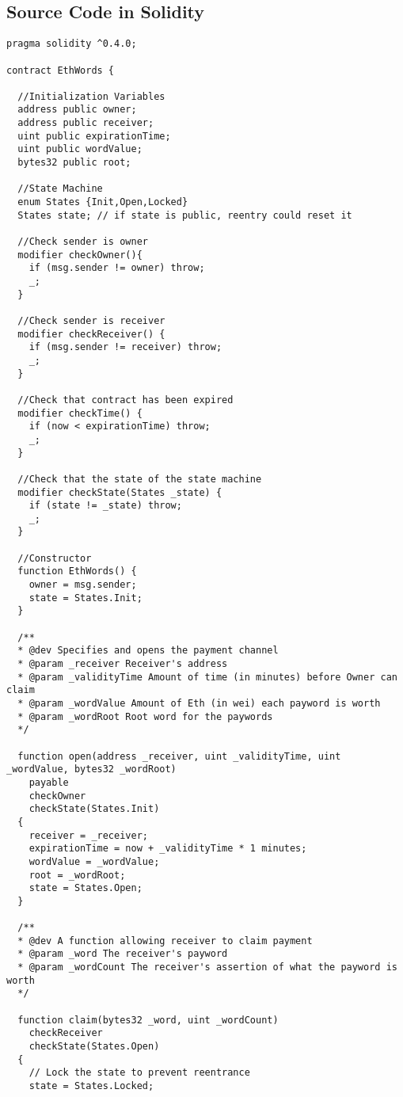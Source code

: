 
\subsection{\ew Source Code in Solidity}
\label{sec:code}

\begin{lstlisting}[basicstyle=\scriptsize\ttfamily]
pragma solidity ^0.4.0;

contract EthWords {

  //Initialization Variables
  address public owner;
  address public receiver;
  uint public expirationTime;
  uint public wordValue;
  bytes32 public root;

  //State Machine
  enum States {Init,Open,Locked}
  States state; // if state is public, reentry could reset it

  //Check sender is owner
  modifier checkOwner(){
    if (msg.sender != owner) throw;
    _;
  }

  //Check sender is receiver
  modifier checkReceiver() {
    if (msg.sender != receiver) throw;
    _;
  }

  //Check that contract has been expired
  modifier checkTime() {
    if (now < expirationTime) throw;
    _;
  }

  //Check that the state of the state machine
  modifier checkState(States _state) {
    if (state != _state) throw;
    _;
  }

  //Constructor
  function EthWords() {
    owner = msg.sender;
    state = States.Init;
  }

  /**
  * @dev Specifies and opens the payment channel
  * @param _receiver Receiver's address
  * @param _validityTime Amount of time (in minutes) before Owner can claim
  * @param _wordValue Amount of Eth (in wei) each payword is worth
  * @param _wordRoot Root word for the paywords
  */

  function open(address _receiver, uint _validityTime, uint _wordValue, bytes32 _wordRoot)
    payable
    checkOwner
    checkState(States.Init)
  {
    receiver = _receiver;
    expirationTime = now + _validityTime * 1 minutes;
    wordValue = _wordValue;
    root = _wordRoot;
    state = States.Open;
  }
  
  /**
  * @dev A function allowing receiver to claim payment
  * @param _word The receiver's payword
  * @param _wordCount The receiver's assertion of what the payword is worth
  */

  function claim(bytes32 _word, uint _wordCount)
    checkReceiver
    checkState(States.Open)
  {
    // Lock the state to prevent reentrance
    state = States.Locked;


\end{lstlisting}
